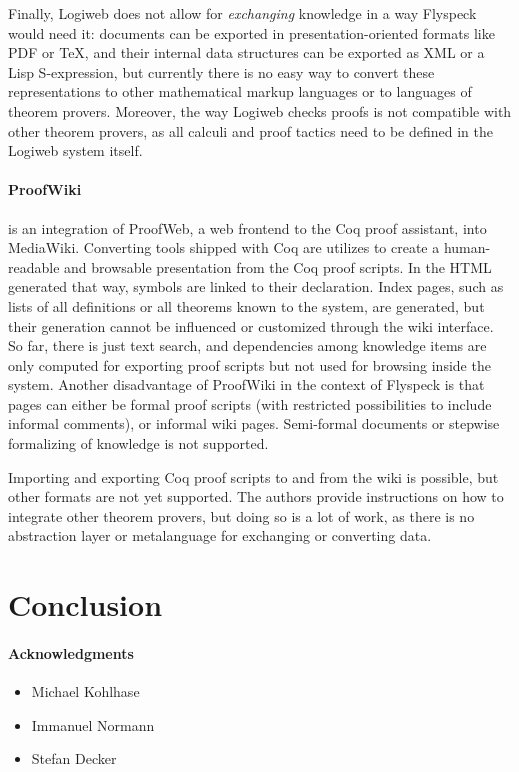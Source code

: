 \documentclass{llncs}
\begin{document}
Finally, Logiweb does not allow for \emph{exchanging} knowledge in a way Flyspeck would
need it: documents can be exported in presentation-oriented formats like PDF or \TeX{},
and their internal data structures can be exported as XML or a Lisp S-expression, but
currently there is no easy way to convert these representations to other mathematical
markup languages or to languages of theorem provers.  Moreover, the way Logiweb checks
proofs is not compatible with other theorem provers, as all calculi and proof tactics need
to be defined in the Logiweb system itself.

\paragraph{ProofWiki~\cite{CorKal:CoopReposFormalProofs07}} is an integration of ProofWeb,
a web frontend to the Coq proof assistant, into MediaWiki.  Converting tools shipped with
Coq are utilizes to create a human-readable and browsable presentation from the Coq proof
scripts.  In the HTML generated that way, symbols are linked to their declaration.  Index
pages, such as lists of all definitions or all theorems known to the system, are
generated, but their generation cannot be influenced or customized through the wiki
interface.  So far, there is just text search, and dependencies
among knowledge items are only computed for exporting proof scripts but not used for
browsing inside the system.  Another disadvantage of ProofWiki in the context of Flyspeck
is that pages can either be formal proof scripts (with restricted possibilities to include
informal comments), or informal wiki pages.  Semi-formal documents or stepwise formalizing
of knowledge is not supported.

Importing and exporting Coq proof scripts to and from the wiki is possible, but other
formats are not yet supported.  The authors provide instructions on how to integrate other
theorem provers, but doing so is a lot of work, as there is no abstraction layer or
metalanguage for exchanging or converting data.


\section{Conclusion}
\label{sec:conc}


\paragraph{Acknowledgments}
\label{sec:ack}

\begin{itemize}
\item Michael Kohlhase
\item Immanuel Normann
\item Stefan Decker
\end{itemize}





\ednotemessage
\end{document}
